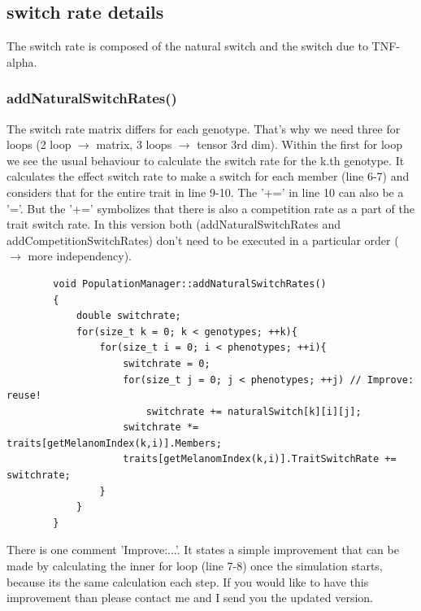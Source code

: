 \documentclass[a4paper,10pt]{scrartcl}
\begin{document}
	\subsection{switch rate details}
	The switch rate is composed of the natural switch and the switch due to TNF-alpha. 
		\subsubsection{addNaturalSwitchRates()}
		The switch rate matrix differs for each genotype. That's why we need three for loops (2 loop $ \to $ matrix, 3 loops $ \to $ tensor 3rd dim). Within the first for loop we see the usual behaviour to calculate the switch rate for the k.th genotype. It calculates the effect switch rate to make a switch for each member (line 6-7) and considers that for the entire trait in line 9-10. The '+=' in line 10 can also be a '='. But the '+=' symbolizes that there is also a competition rate as a part of the trait switch rate. In this version both (addNaturalSwitchRates and addCompetitionSwitchRates) don't need to be executed in a particular order ($ \to $ more independency).
		\begin{lstlisting}
		void PopulationManager::addNaturalSwitchRates()
		{
		    double switchrate;
		    for(size_t k = 0; k < genotypes; ++k){
		        for(size_t i = 0; i < phenotypes; ++i){
		            switchrate = 0;
		            for(size_t j = 0; j < phenotypes; ++j) // Improve: reuse!
		                switchrate += naturalSwitch[k][i][j];
		            switchrate *= traits[getMelanomIndex(k,i)].Members;
		            traits[getMelanomIndex(k,i)].TraitSwitchRate += switchrate;
		        }
		    }
		}
		\end{lstlisting}	
		There is one comment 'Improve:...'. It states a simple improvement that can be made by calculating the inner for loop (line 7-8) once the simulation starts, because its the same calculation each step. If you would like to have this improvement than please contact me and I send you the updated version.
			
\end{document}
